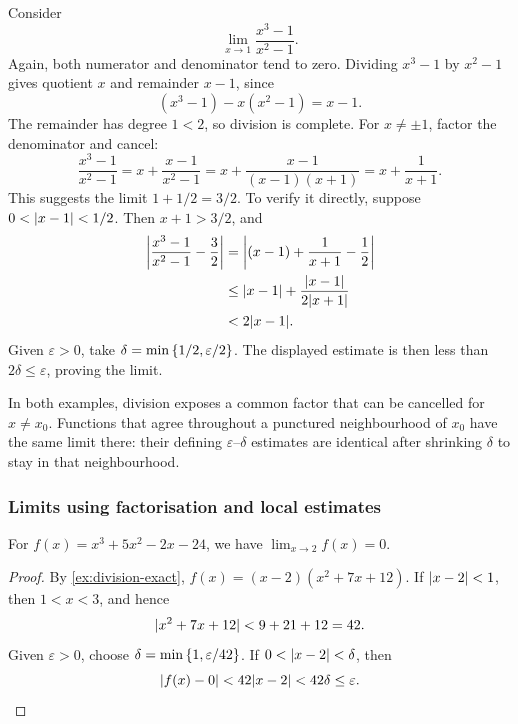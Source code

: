 \documentclass[11pt,a4paper]{amsart}
\begin{document}
\begin{example}
  Consider
  \[
    \lim_{x\to1}\frac{x^3-1}{x^2-1}.
  \]
  Again, both numerator and denominator tend to zero. Dividing
  \(x^3-1\) by \(x^2-1\) gives quotient \(x\) and remainder
  \(x-1\), since
  \[
    (x^3-1)-x(x^2-1)=x-1.
  \]
  The remainder has degree \(1<2\), so division is complete.
  For \(x\neq\pm1\), factor the denominator and cancel:
  \[
    \frac{x^3-1}{x^2-1}
    =x+\frac{x-1}{x^2-1}
    =x+\frac{x-1}{(x-1)(x+1)}
    =x+\frac1{x+1}.
  \]
  This suggests the limit \(1+1/2=3/2\). To verify it directly,
  suppose \(0<\abs{x-1}<1/2\). Then \(x+1>3/2\), and
  \begin{align*}
    \abs*{\frac{x^3-1}{x^2-1}-\frac32}
    &=\abs*{(x-1)+\frac1{x+1}-\frac12}\\
    &\leq\abs{x-1}+\frac{\abs{x-1}}{2\abs{x+1}}\\
    &<2\abs{x-1}.
  \end{align*}
  Given \(\varepsilon>0\), take
  \(\delta=\min\set{1/2,\varepsilon/2}\). The displayed estimate
  is then less than \(2\delta\leq\varepsilon\), proving the limit.
\end{example}

\begin{remark}
  In both examples, division exposes a common factor that can be
  cancelled for \(x\neq x_0\). Functions that agree throughout a
  punctured neighbourhood of \(x_0\) have the same limit there:
  their defining \(\varepsilon\)--\(\delta\) estimates are identical
  after shrinking \(\delta\) to stay in that neighbourhood.
\end{remark}

\subsubsection{Limits using factorisation and local estimates}

\begin{example}
  For \(f(x)=x^3+5x^2-2x-24\), we have
  \(\lim_{x\to2}f(x)=0\).
\end{example}

\begin{proof}
  By \cref{ex:division-exact}, \(f(x)=(x-2)(x^2+7x+12)\).
  If \(\abs{x-2}<1\), then \(1<x<3\), and hence
  \[
    \abs{x^2+7x+12}<9+21+12=42.
  \]
  Given \(\varepsilon>0\), choose
  \(\delta=\min\set{1,\varepsilon/42}\). If
  \(0<\abs{x-2}<\delta\), then
  \[
    \abs{f(x)-0}<42\abs{x-2}<42\delta\leq\varepsilon.
  \]
\end{proof}
\end{document}
